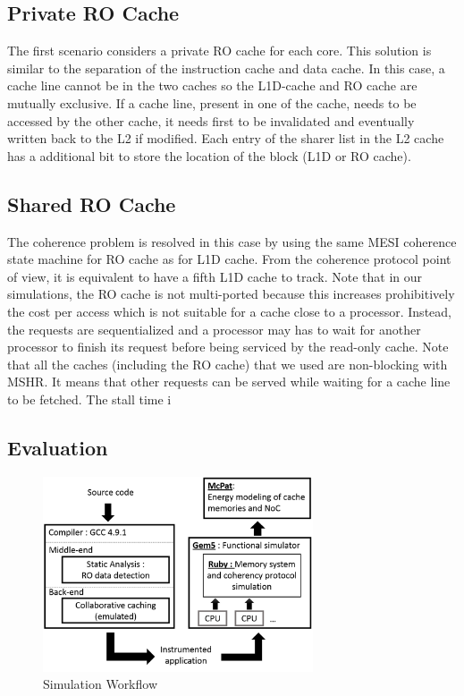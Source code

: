 \documentclass[sigconf]{acmart}
\begin{document}
\subsection{Private RO Cache}

The first scenario considers a private RO cache for each core. This solution is similar to the separation of the instruction cache and data cache. In this case, a cache line cannot be in the two caches so the L1D-cache and RO cache are mutually exclusive. If a cache line, present in one of the cache, needs to be accessed by the other cache, it needs first to be invalidated and eventually written back to the L2 if modified. Each entry of the sharer list in the L2 cache has a additional bit to store the location of the block (L1D or RO cache). 

\subsection{Shared RO Cache}

The coherence problem is resolved in this case by using the same MESI coherence state machine for RO cache as for L1D cache. From the coherence protocol point of view, it is equivalent to have a fifth L1D cache to track. Note that in our simulations, the RO cache is not multi-ported because this increases prohibitively the cost per access which is not suitable for a cache close to a processor. Instead, the requests are sequentialized and a processor may has to wait for another processor to finish its request before being serviced by the read-only cache. Note that all the caches (including the RO cache) that we used are non-blocking with MSHR. It means that other requests can be served while waiting for a cache line to be fetched. The stall time i


\subsection{Evaluation}

\begin{figure}
    \centering
    \includegraphics[width=8cm]{./images/workflow.png}
    \caption{Simulation Workflow}
    \label{workflow}
\end{figure}
\end{document}
